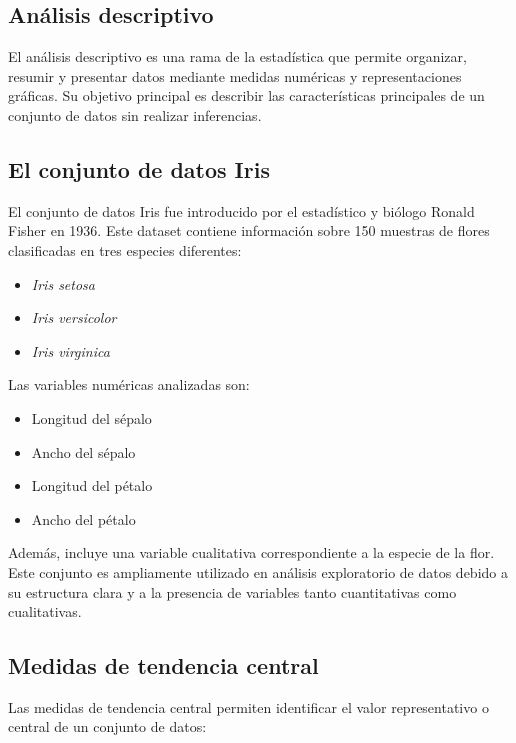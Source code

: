 \documentclass[12pt,a4paper]{article}
\begin{document}
\subsection{Análisis descriptivo}

El análisis descriptivo es una rama de la estadística que permite organizar, resumir y presentar datos mediante medidas numéricas y representaciones gráficas. Su objetivo principal es describir las características principales de un conjunto de datos sin realizar inferencias.

\subsection{El conjunto de datos Iris}

El conjunto de datos Iris fue introducido por el estadístico y biólogo Ronald Fisher en 1936. Este dataset contiene información sobre 150 muestras de flores clasificadas en tres especies diferentes:

\begin{itemize}
    \item \textit{Iris setosa}
    \item \textit{Iris versicolor}
    \item \textit{Iris virginica}
\end{itemize}

Las variables numéricas analizadas son:

\begin{itemize}
    \item Longitud del sépalo
    \item Ancho del sépalo
    \item Longitud del pétalo
    \item Ancho del pétalo
\end{itemize}

Además, incluye una variable cualitativa correspondiente a la especie de la flor. Este conjunto es ampliamente utilizado en análisis exploratorio de datos debido a su estructura clara y a la presencia de variables tanto cuantitativas como cualitativas.

\subsection{Medidas de tendencia central}

Las medidas de tendencia central permiten identificar el valor representativo o central de un conjunto de datos:
\end{document}
